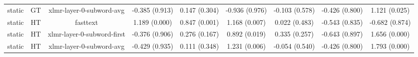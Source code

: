 \begin{sidewaystable}[htb]
\begin{tabular}{@{}ccccccccc@{}}
        static & GT & xlmr-layer-0-subword-avg & -0.385 (0.913) & 0.147 (0.304) & -0.936 (0.976) & -0.103 (0.578) & -0.426 (0.800) & 1.121 (0.025) \\
        static & HT & fasttext & 1.189 (0.000) & 0.847 (0.001) & 1.168 (0.007) & 0.022 (0.483) & -0.543 (0.835) & -0.682 (0.874) \\
        static & HT & xlmr-layer-0-subword-first & -0.376 (0.906) & 0.276 (0.167) & 0.892 (0.019) & 0.335 (0.257) & -0.643 (0.897) & 1.656 (0.000) \\
        static & HT & xlmr-layer-0-subword-avg & -0.429 (0.935) & 0.111 (0.348) & 1.231 (0.006) & -0.054 (0.540) & -0.426 (0.800) & 1.793 (0.000) \\
        \bottomrule
    \end{tabular}
\end{sidewaystable}